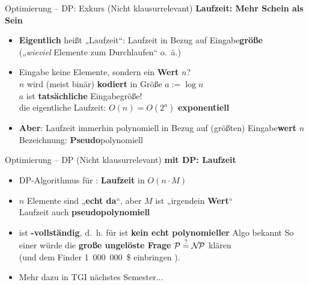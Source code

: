 \begin{frame}{Optimierung – DP: Exkurs {\footnotesize (Nicht klausurrelevant)}}
	\textbf{Laufzeit: Mehr Schein als Sein} 
	\begin{itemize}
		\item \textbf{Eigentlich} heißt „Laufzeit“: Laufzeit in Bezug auf Eingabe\textbf{größe} \\
		{\small („\textit{wieviel} Elemente zum Durchlaufen“ o.~ä.)}
		\pause
		\item Eingabe keine Elemente, sondern ein \textbf{Wert} $n$? \\
		 $n$ wird (meist binär) \textbf{kodiert} in Größe $a := \log n$ \\ 
		 \impl $a$ ist \textbf{tatsächliche} Eingabegröße! \\
		 \impl die eigentliche Laufzeit: $O(n) = O(2^a)$ \impl \textbf{exponentiell}
		\pause
		\item \textbf{Aber}: Laufzeit immerhin polynomiell in Bezug auf {\small (größten)} Eingabe\textbf{wert} $n$ \impl Bezeichnung: \textbf{Pseudo}polynomiell \\
	\end{itemize}
\end{frame}

\begin{frame}{Optimierung – DP {\footnotesize (Nicht klausurrelevant)}}
	\textbf{\Knapsack mit DP: Laufzeit} 
	\begin{itemize}
		\item DP-Algorithmus für \Knapsack: \textbf{Laufzeit} in $O(n \cdot M)$
		\item $n$ Elemente sind „\textbf{echt da}“, aber $M$ ist „irgendein \textbf{Wert}“ \\
		\impl Laufzeit auch \textbf{pseudopolynomiell}
		\pause
		\item \Knapsack ist \textbf{\NP-vollständig}, d.~h. für \Knapsack ist \textbf{kein echt polynomieller} Algo bekannt
		\pause
		\implitem So einer würde die \textbf{große ungelöste Frage} $\mathcal{P} \stackrel{?}{=} \mathcal{N\hspace{-1.5pt}P}$ klären \\ 
		(und dem Finder 1~000~000~\$ einbringen \smiley).
		\pause
		\item Mehr dazu in TGI nächstes Semester...
	\end{itemize}
\end{frame}

